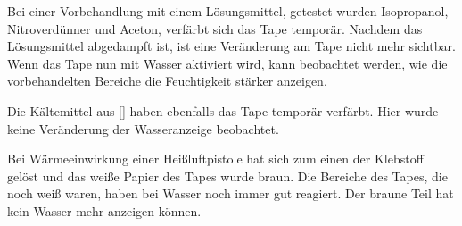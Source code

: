 

Bei einer Vorbehandlung mit einem Lösungsmittel, getestet wurden Isopropanol, Nitroverdünner und Aceton, verfärbt sich das Tape temporär. Nachdem das Lösungsmittel abgedampft ist, ist eine Veränderung am Tape nicht mehr sichtbar. Wenn das Tape nun mit Wasser aktiviert wird, kann beobachtet werden, wie die vorbehandelten Bereiche die Feuchtigkeit stärker anzeigen.

Die Kältemittel aus \ref{} haben ebenfalls das Tape temporär verfärbt. Hier wurde keine Veränderung der Wasseranzeige beobachtet.

Bei Wärmeeinwirkung einer Heißluftpistole hat sich zum einen der Klebstoff gelöst und das weiße Papier des Tapes wurde braun. Die Bereiche des Tapes, die noch weiß waren, haben bei Wasser noch immer gut reagiert. Der braune Teil hat kein Wasser mehr anzeigen können.
